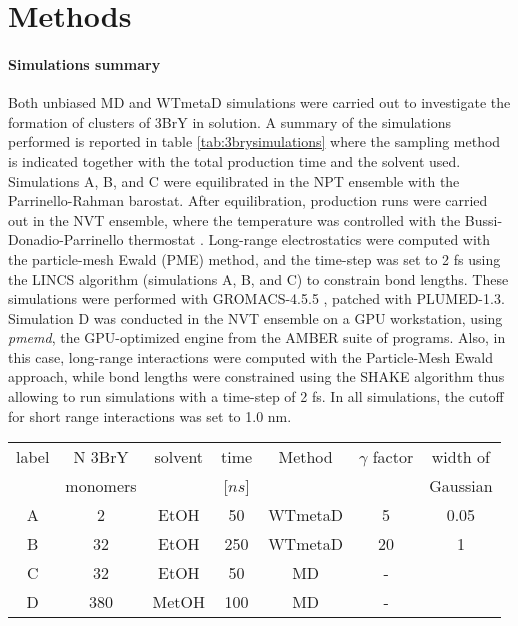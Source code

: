 \documentclass[journal=cgdefu,manuscript=article,layout=twocolumn]{achemso}
\begin{document}
\section{Methods}
\label{sec:method3br}

\paragraph{Simulations summary}
Both unbiased MD and WTmetaD simulations were carried out to investigate the formation of clusters of 3BrY in solution. 
A summary of the simulations performed is reported in table \ref{tab:3brysimulations} where the sampling method is indicated together with the total production time and the solvent used.
Simulations A, B, and C were equilibrated in the NPT ensemble with the Parrinello-Rahman barostat\cite{Parrinello}. After equilibration, production runs were carried out in the NVT ensemble, where the temperature was controlled with the Bussi-Donadio-Parrinello thermostat \cite{Bussi}. Long-range electrostatics were computed with the particle-mesh Ewald (PME) method, and the time-step was set to 2 fs using the LINCS algorithm (simulations A, B, and C) to constrain bond lengths.
These simulations were performed with GROMACS-4.5.5 \cite{gromacs1,gromacs2,gromacs3,gromacs4}, patched with PLUMED-1.3\cite{PLUMED}. Simulation D was conducted in the NVT ensemble on a GPU workstation, using \emph{pmemd}, the GPU-optimized engine from the AMBER suite of programs\cite{gtz2012routine,salomon2013routine}. Also, in this case, long-range interactions were computed with the Particle-Mesh Ewald approach, while bond lengths were constrained using the SHAKE algorithm thus allowing to run simulations with a time-step of 2 fs. In all simulations, the cutoff for short range interactions was set to 1.0 nm. 

\begin{table*}
\centering
\begin{small}
\caption{Details for the 3BrY simulations. For the metadynamics simulations, the $\gamma$ factor was chosen so to quickly temper the bias on the order of tens of ns and sample the whole CV space. The width of the Gaussian was taken to be smaller than the thermal fluctuation of the CV in the minima, to be able to resolve them correctly.}
\label{tab:3brysimulations}
\begin{tabular}{ccccccc}
label& N  3BrY    & solvent&  time   & Method   & $\gamma$ factor & width of \\ 
     & monomers   &        & [$ns$]  &          &             &Gaussian \\   \hline
A    & 2          & EtOH    &    50   &  WTmetaD &     5       &  0.05\\
B    & 32         & EtOH    &   250   &  WTmetaD &     20      &   1\\
C    & 32         & EtOH    &   50    &  MD      &      -      &   \\
D    & 380        & MetOH   &  100    &  MD      &      -      &    \\
\hline
\end{tabular}
\end{small}
\end{table*}
\end{document}
